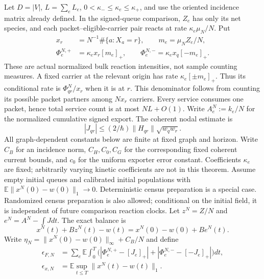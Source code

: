 \documentclass[11pt]{article}
\theoremstyle{definition}\newtheorem{definition}[theorem]{Definition}
\theoremstyle{remark}\newtheorem{remark}[theorem]{Remark}
\begin{document}
Let $D=|V|$, $L=\sum_e L_e$, $0<\kappa_-\le\kappa_e\le\kappa_+$, and use the oriented incidence matrix already defined. In the signed-queue comparison, $Z_e$ has only its net species, and each packet--eligible-carrier pair reacts at rate $\kappa_e\mu_N/N$. Put
\begin{align}
 x_r&=N^{-1}\#\{a:X_a=r\},\qquad m_e=\mu_N Z_e/N,\\
 \Phi_e^{N,+}&=\kappa_e x_r[m_e]_+,\qquad
 \Phi_e^{N,-}=\kappa_e x_q[-m_e]_+ .\label{kin:flux}
\end{align}
These are actual normalized bulk reaction intensities, not sample counting measures. A fixed carrier at the relevant origin has rate $\kappa_e[\pm m_e]_+$. Thus its conditional rate is $\Phi_{qr}^N/x_r$ when it is at $r$. This denominator follows from counting its possible packet partners among $Nx_r$ carriers. Every service consumes one packet, hence total service count is at most $NL+O(1)$.
Write $A_e^N:=k_e/N$ for the normalized cumulative signed export.
The coherent nodal estimate is
\begin{equation}
 |J_{qr}|\le (2/\hbar)\|H_{qr}\|\sqrt{w_qw_r} .\label{kin:nodal}
\end{equation}
All graph-dependent constants below are finite at fixed graph and horizon. Write $C_B$ for an incidence norm, $C_H,C_0,C_G$ for the corresponding fixed coherent current bounds, and $c_0$ for the uniform exporter error constant. Coefficients $\kappa_e$ are fixed; arbitrarily varying kinetic coefficients are not in this theorem.
Assume empty initial queues and calibrated initial populations with
$\mathbb E\|x^N(0)-w(0)\|_1\to0$. Deterministic census preparation is a
special case. Randomized census preparation is also allowed; conditional
on the initial field, it is independent of future comparison reaction
clocks. Let $z^N=Z/N$ and
$e^N=A^N-\int Jdt$. The exact balance is
\begin{equation}
 x^N(t)+Bz^N(t)-w(t)=x^N(0)-w(0)+Be^N(t).
 \label{kin:balance}
\end{equation}
Write $\eta_N=\|x^N(0)-w(0)\|_\infty+C_B/N$ and define
\begin{align}
 \epsilon_{F,N}&=\sum_e\mathbb E\int_0^T
 \bigl(|\Phi_e^{N,+}-[J_e]_+|+
 |\Phi_e^{N,-}-[-J_e]_+|\bigr)dt,\label{kin:epsF}\\
 \epsilon_{x,N}&=\mathbb E\sup_{t\le T}\|x^N(t)-w(t)\|_1.
 \label{kin:epsx}
\end{align}
\end{document}
